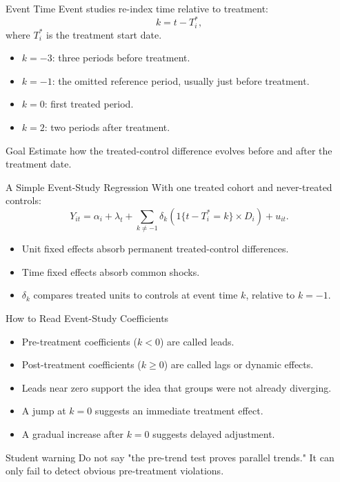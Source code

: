 \documentclass[11pt,aspectratio=169]{beamer}
\newcommand{\derivbutton}[1]{\vspace{0.4em}\hfill\hyperlink{app:#1}{\beamerbutton{Appendix details}}}
\begin{document}
\begin{frame}{Event Time}
  Event studies re-index time relative to treatment:
  \[
    k = t - T_i^\ast,
  \]
  where \(T_i^\ast\) is the treatment start date.
  \vspace{0.4em}
  \begin{itemize}
    \item \(k=-3\): three periods before treatment.
    \item \(k=-1\): the omitted reference period, usually just before treatment.
    \item \(k=0\): first treated period.
    \item \(k=2\): two periods after treatment.
  \end{itemize}
  \begin{block}{Goal}
    Estimate how the treated-control difference evolves before and after the treatment date.
  \end{block}
\end{frame}

\begin{frame}{A Simple Event-Study Regression}
  \hypertarget{main:event-study}{}
  With one treated cohort and never-treated controls:
  \[
    Y_{it}
    =
    \alpha_i+\lambda_t
    +
    \sum_{k\neq -1}\delta_k
    \left(1\{t-T^\ast_i=k\}\times D_i\right)
    +
    u_{it}.
  \]
  \vspace{0.3em}
  \begin{itemize}
    \item Unit fixed effects absorb permanent treated-control differences.
    \item Time fixed effects absorb common shocks.
    \item \(\delta_k\) compares treated units to controls at event time \(k\), relative to \(k=-1\).
  \end{itemize}
  \derivbutton{event-study}
\end{frame}

\begin{frame}{How to Read Event-Study Coefficients}
  \begin{itemize}
    \item Pre-treatment coefficients (\(k<0\)) are called leads.
    \item Post-treatment coefficients (\(k\geq 0\)) are called lags or dynamic effects.
    \item Leads near zero support the idea that groups were not already diverging.
    \item A jump at \(k=0\) suggests an immediate treatment effect.
    \item A gradual increase after \(k=0\) suggests delayed adjustment.
  \end{itemize}
  \begin{block}{Student warning}
    Do not say "the pre-trend test proves parallel trends." It can only fail to detect obvious pre-treatment violations.
  \end{block}
\end{frame}
\end{document}
